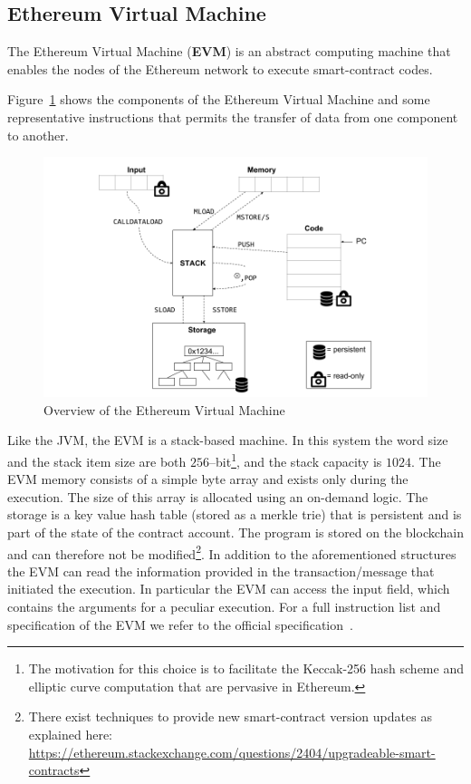\subsection{Ethereum Virtual Machine}
The Ethereum Virtual Machine (\textbf{EVM}) is an abstract computing machine
that enables the nodes of the Ethereum network to execute smart-contract
codes.

Figure~\ref{fig:evm} shows the components of the Ethereum Virtual Machine
and some representative instructions that permits the transfer of data
from one component to another.
\begin{figure}
	\begin{center}
		\includegraphics[width=\textwidth]
        {./res/img/architecture/evm/EVM.png}
	\end{center}
	\caption{Overview of the Ethereum Virtual Machine}
	\label{fig:evm}
\end{figure}
Like the JVM, the EVM is a stack-based machine. In this system the word size
and the stack item size are both $256$--bit\footnote{The motivation
for this choice is to facilitate the Keccak-256 hash scheme and elliptic
curve computation that are pervasive in Ethereum.},
and the stack capacity is $1024$.
The EVM memory consists of a simple byte array and exists only during the
execution. The size of this array is allocated using an on-demand logic.
The storage is a key value hash table (stored as a merkle trie) that is
persistent and is part of the state of the contract account.
The program is stored on the blockchain and can therefore not
be modified\footnote{There exist
techniques to provide new smart-contract version updates as explained
here:
\url{https://ethereum.stackexchange.com/questions/2404/upgradeable-smart-contracts}}.
In addition to the aforementioned structures the EVM can read the information
provided in the transaction/message that initiated the execution. In particular
the EVM can access the input field, which contains the arguments for a peculiar
execution.
For a full instruction list and specification of the EVM
we refer to the official specification~\cite{wood2018ethereum}.


